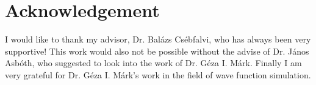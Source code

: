 \section{Acknowledgement}

I would like to thank my advisor, Dr. Balázs Csébfalvi, who has always been very supportive!
This work would also not be possible without the advise of Dr. János Asbóth, who suggested to look into the work of Dr. Géza I. Márk.
Finally I am very grateful for Dr. Géza I. Márk's work in the field of wave function simulation.
